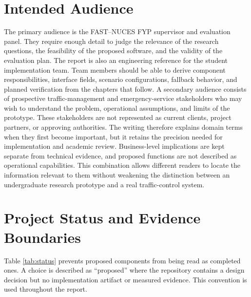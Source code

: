 \section{Intended Audience}

The primary audience is the FAST--NUCES FYP supervisor and evaluation panel. They require enough detail to judge the relevance of the research questions, the feasibility of the proposed software, and the validity of the evaluation plan. The report is also an engineering reference for the student implementation team. Team members should be able to derive component responsibilities, interface fields, scenario configurations, fallback behavior, and planned verification from the chapters that follow. A secondary audience consists of prospective traffic-management and emergency-service stakeholders who may wish to understand the problem, operational assumptions, and limits of the prototype. These stakeholders are not represented as current clients, project partners, or approving authorities. The writing therefore explains domain terms when they first become important, but it retains the precision needed for implementation and academic review. Business-level implications are kept separate from technical evidence, and proposed functions are not described as operational capabilities. This combination allows different readers to locate the information relevant to them without weakening the distinction between an undergraduate research prototype and a real traffic-control system.

\section{Project Status and Evidence Boundaries}
\label{sec:status}

Table \ref{tab:status} prevents proposed components from being read as completed ones. A choice is described as ``proposed'' where the repository contains a design decision but no implementation artifact or measured evidence. This convention is used throughout the report.

